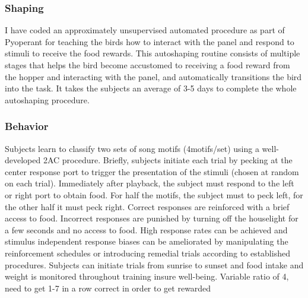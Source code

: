 \subsubsection{Shaping}
I have coded an approximately unsupervised automated procedure as part of Pyoperant for teaching the birds how to interact with the panel and respond to stimuli to receive the food rewards. This autoshaping routine\cite{brown1968auto} consists of multiple stages that helps the bird become accustomed to receiving a food reward from the hopper and interacting with the panel, and automatically transitions the bird into the task. It takes the subjects an average of 3-5 days to complete the whole autoshaping procedure.

\subsubsection{Behavior}
Subjects learn to classify two sets of song motifs (4motifs/set) using a well-developed \ac{2AC} procedure\cite{gentner2003neuronal}. Briefly, subjects initiate each trial by pecking at the center response port to trigger the presentation of the stimuli (chosen at random on each trial). Immediately after playback, the subject must respond to the left or right port to obtain food. For half the motifs, the subject must to peck left, for the other half it must peck right. Correct responses are reinforced with a brief access to food. Incorrect responses are punished by turning off the houselight for a few seconds and no access to food. High response rates can be achieved and stimulus independent response biases can be ameliorated by manipulating the reinforcement schedules or introducing remedial trials according to established procedures. Subjects can initiate trials from sunrise to sunset and food intake and weight is monitored throughout training insure well-being.
Variable ratio of 4, need to get 1-7 in a row correct in order to get rewarded

